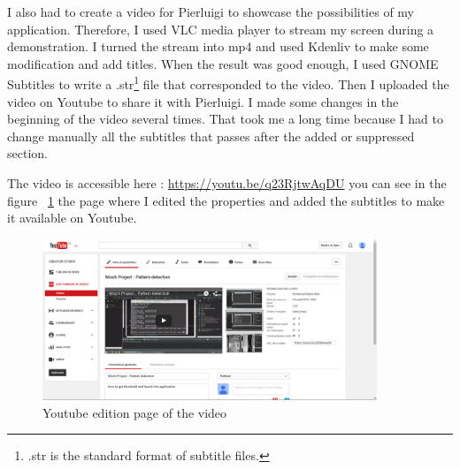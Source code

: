 	\par I also had to create a video for Pierluigi to showcase the possibilities of my application. Therefore, I used VLC media player to stream my screen during a demonstration. I turned the stream into mp4 and used Kdenliv to make some modification and add titles. When the result was good enough, I used GNOME Subtitles to write a .str\footnote{.str is the standard format of subtitle files.} file that corresponded to the video. Then I uploaded the video on Youtube to share it with Pierluigi. I made some changes in the beginning of the video several times. That took me a long time because I had to change manually all the subtitles that passes after the added or suppressed section.
	\par The video is accessible here : \url{https://youtu.be/q23RjtwAqDU} you can see in the figure ~\ref{video} the page where I edited the properties and added the subtitles to make it available on Youtube.
\begin{figure}[h]
		\begin{center}
			\includegraphics[width=10cm]{images_not_compressed/screenShot.png}
			\caption{Youtube edition page of the video}
			\label{video}	
		\end{center}
	\end{figure}	